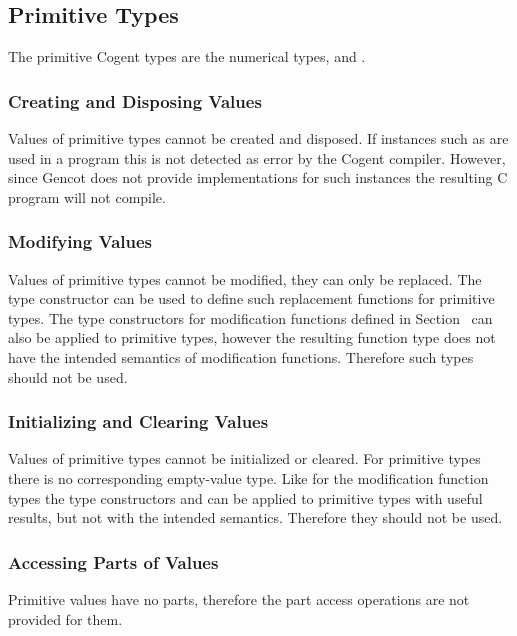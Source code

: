 \subsection{Primitive Types}
\label{design-operations-prim}

The primitive Cogent types are the numerical types,  and . 

\subsubsection{Creating and Disposing Values}

Values of primitive types cannot be created and disposed. If instances such as  are used in a program 
this is not detected as error by the Cogent compiler. However, since Gencot does not provide implementations for such
instances the resulting C program will not compile.

\subsubsection{Modifying Values}

Values of primitive types cannot be modified, they can only be replaced. The type constructor  
can be used to define such replacement functions for primitive types. The type constructors for modification functions
defined in Section~ can also
be applied to primitive types, however the resulting function type does not have the
intended semantics of modification functions. Therefore such types should not be used.

\subsubsection{Initializing and Clearing Values}

Values of primitive types cannot be initialized or cleared. For primitive types there is no corresponding empty-value type.
Like for the modification function types the type constructors
 and  can be applied to primitive types with useful results, but not with the intended semantics.
Therefore they should not be used.

\subsubsection{Accessing Parts of Values}

Primitive values have no parts, therefore the part access operations are not provided for them.


